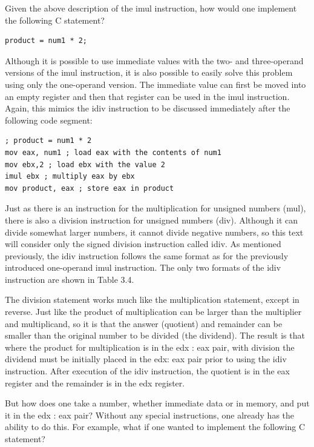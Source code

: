 \documentclass[10pt]{book}
\begin{document}
Given the above description of the imul instruction, how would one implement the following C statement?

\begin{verbatim}
product = num1 * 2;
\end{verbatim}

Although it is possible to use immediate values with the two- and three-operand versions of the imul instruction, it is also possible to easily solve this problem using only the one-operand version. The immediate value can first be moved into an empty register and then that register can be used in the imul instruction. Again, this mimics the idiv instruction to be discussed immediately after the following code segment:

\begin{verbatim}
; product = num1 * 2
mov eax, num1 ; load eax with the contents of num1
mov ebx,2 ; load ebx with the value 2
imul ebx ; multiply eax by ebx
mov product, eax ; store eax in product
\end{verbatim}

Just as there is an instruction for the multiplication for unsigned numbers (mul), there is also a division instruction for unsigned numbers (div). Although it can divide somewhat larger numbers, it cannot divide negative numbers, so this text will consider only the signed division instruction called idiv. As mentioned previously, the idiv instruction follows the same format as for the previously introduced one-operand imul instruction. The only two formats of the idiv instruction are shown in Table 3.4.

The division statement works much like the multiplication statement, except in reverse. Just like the product of multiplication can be larger than the multiplier and multiplicand, so it is that the answer (quotient) and remainder can be smaller than the original number to be divided (the dividend). The result is that where the product for multiplication is in the edx : eax pair, with division the dividend must be initially placed in the edx: eax pair prior to using the idiv instruction. After execution of the idiv instruction, the quotient is in the eax register and the remainder is in the edx register.

But how does one take a number, whether immediate data or in memory, and put it in the edx : eax pair? Without any special instructions, one already has the ability to do this. For example, what if one wanted to implement the following C statement?
\end{document}
